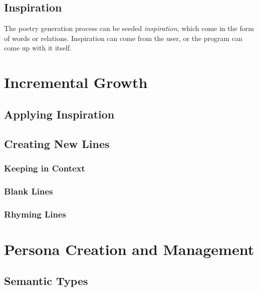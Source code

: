 \subsection{Inspiration}
The poetry generation process can be seeded \textit{inspiration}, which come in the form of words or relations. Inspiration can come from the user, or the program can come up with it itself.


\section{Incremental Growth}

\subsection{Applying Inspiration}


\subsection{Creating New Lines}
\label{sec:new-lines}
\subsubsection{Keeping in Context}
\subsubsection{Blank Lines}
\subsubsection{Rhyming Lines}


\section{Persona Creation and Management}
\label{sec:persona}

\subsection{Semantic Types}

